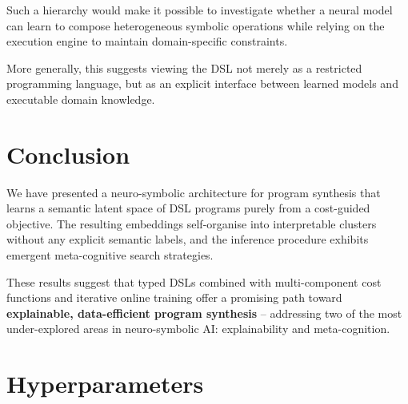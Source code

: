 \documentclass[final]{nesy2027}
\begin{document}
Such a hierarchy would make it possible to investigate whether a neural model
can learn to compose heterogeneous symbolic operations while relying on the
execution engine to maintain domain-specific constraints.

More generally, this suggests viewing the DSL not merely as a restricted
programming language, but as an explicit interface between learned models and
executable domain knowledge.

\section{Conclusion}
\label{sec:conclusion}

We have presented a neuro-symbolic architecture for program synthesis that learns
a semantic latent space of DSL programs purely from a cost-guided objective.
The resulting embeddings self-organise into interpretable clusters without any
explicit semantic labels, and the inference procedure exhibits emergent
meta-cognitive search strategies.

These results suggest that typed DSLs combined with multi-component cost
functions and iterative online training offer a promising path toward
\textbf{explainable, data-efficient program synthesis} -- addressing two of the
most under-explored areas in neuro-symbolic AI: explainability and meta-cognition.




\appendix

\section{Hyperparameters}
\label{apd:hyper}
\end{document}
